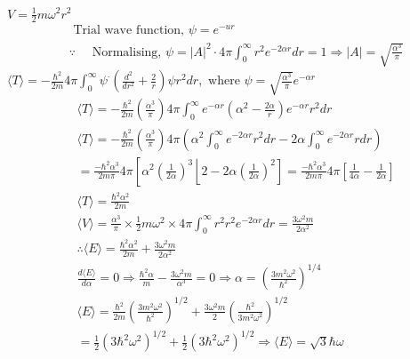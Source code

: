 \begin{enumerate}
\begin{minipage}{\textwidth}
\end{minipage}
\begin{answer}
	$V=\frac{1}{2} m \omega^{2} r^{2}$\\
	\begin{align*}
		&\text { Trial wave function, } \psi=e^{-u r} \\
		&\because \quad \text { Normalising, } \psi=|A|^{2} \cdot 4 \pi \int_{0}^{\infty} r^{2} e^{-2 \alpha r} d r=1 \Rightarrow|A|=\sqrt{\frac{\alpha^{3}}{\pi}}
	\end{align*}
	$\langle T\rangle=-\frac{\hbar^{2}}{2 m} 4 \pi \int_{0}^{\infty} \psi^{\cdot}\left(\frac{d^{2}}{d r^{2}}+\frac{2}{r}\right) \psi r^{2} d r, \text { where } \psi=\sqrt{\frac{\alpha^{3}}{\pi}} e^{-\alpha r}$\\
	\begin{align*}
		&\langle T\rangle=-\frac{\hbar^{2}}{2 m}\left(\frac{\alpha^{3}}{\pi}\right) 4 \pi \int_{0}^{\infty} e^{-\alpha r}\left(\alpha^{2}-\frac{2 \alpha}{r}\right) e^{-\alpha r} r^{2} d r \\
		&\langle T\rangle=-\frac{\hbar^{2}}{2 m}\left(\frac{\alpha^{3}}{\pi}\right) 4 \pi\left(\alpha^{2} \int_{0}^{\infty} e^{-2 \alpha r} r^{2} d r-2 \alpha \int_{0}^{\infty} e^{-2 \alpha r} r d r\right) \\
		&=\frac{-\hbar^{2} \alpha^{3}}{2 m \pi} 4 \pi\left[\alpha^{2}\left(\frac{1}{2 \alpha}\right)^{3}\left\lfloor 2-2 \alpha\left(\frac{1}{2 \alpha}\right)^{2}\right]=\frac{-\hbar^{2} \alpha^{3}}{2 m \pi} 4 \pi\left[\frac{1}{4 \alpha}-\frac{1}{2 \alpha}\right]\right.\\
		&\langle T\rangle=\frac{\hbar^{2} \alpha^{2}}{2 m} \\
		&\langle V\rangle=\frac{\alpha^{3}}{\pi} \times \frac{1}{2} m \omega^{2} \times 4 \pi \int_{0}^{\infty} r^{2} r^{2} e^{-2 \alpha r} d r=\frac{3 \omega^{2} m}{2 \alpha^{2}} \\
		&\therefore\langle E\rangle=\frac{\hbar^{2} \alpha^{2}}{2 m}+\frac{3 \omega^{2} m}{2 \alpha^{2}}\\
		&\frac{d\langle E\rangle}{d \alpha}=0 \Rightarrow \frac{\hbar^{2} \alpha}{m}-\frac{3 \omega^{2} m}{\alpha^{3}}=0 \Rightarrow \alpha=\left(\frac{3 m^{2} \omega^{2}}{\hbar^{2}}\right)^{1 / 4} \\
		&\langle E\rangle=\frac{\hbar^{2}}{2 m}\left(\frac{3 m^{2} \omega^{2}}{\hbar^{2}}\right)^{1 / 2}+\frac{3 \omega^{2} m}{2}\left(\frac{\hbar^{2}}{3 m^{2} \omega^{2}}\right)^{1 / 2} \\
		&=\frac{1}{2}\left(3 \hbar^{2} \omega^{2}\right)^{1 / 2}+\frac{1}{2}\left(3 \hbar^{2} \omega^{2}\right)^{1 / 2} \Rightarrow\langle E\rangle=\sqrt{3} \hbar \omega

\end{align*}
\end{answer}
\end{enumerate}
